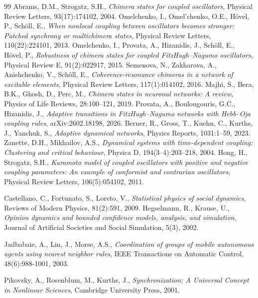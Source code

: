 ﻿\documentclass[11pt]{article}
\begin{document}
\begin{thebibliography}{99}
 Abrams, D.M., Strogatz, S.H., \emph{Chimera states for coupled oscillators}, Physical Review Letters, 93(17):174102, 2004.
 Omelchenko, I., Omel'chenko, O.E., H\"ovel, P., Sch\"oll, E., \emph{When nonlocal coupling between oscillators becomes stronger: Patched synchrony or multichimera states}, Physical Review Letters, 110(22):224101, 2013.
 Omelchenko, I., Provata, A., Hizanidis, J., Sch\"oll, E., H\"ovel, P., \emph{Robustness of chimera states for coupled FitzHugh--Nagumo oscillators}, Physical Review E, 91(2):022917, 2015.
 Semenova, N., Zakharova, A., Anishchenko, V., Sch\"oll, E., \emph{Coherence-resonance chimeras in a network of excitable elements}, Physical Review Letters, 117(1):014102, 2016.
 Majhi, S., Bera, B.K., Ghosh, D., Perc, M., \emph{Chimera states in neuronal networks: A review}, Physics of Life Reviews, 28:100--121, 2019.
 Provata, A., Boulougouris, G.C., Hizanidis, J., \emph{Adaptive transitions in FitzHugh--Nagumo networks with Hebb--Oja coupling rules}, arXiv:2602.18198, 2026.
 Berner, R., Gross, T., Kuehn, C., Kurths, J., Yanchuk, S., \emph{Adaptive dynamical networks}, Physics Reports, 1031:1--59, 2023.
 Zanette, D.H., Mikhailov, A.S., \emph{Dynamical systems with time-dependent coupling: Clustering and critical behaviour}, Physica D, 194(3--4):203--218, 2004.
 Hong, H., Strogatz, S.H., \emph{Kuramoto model of coupled oscillators with positive and negative coupling parameters: An example of conformist and contrarian oscillators}, Physical Review Letters, 106(5):054102, 2011.

 Castellano, C., Fortunato, S., Loreto, V., \emph{Statistical physics of social dynamics}, Reviews of Modern Physics, 81(2):591, 2009.
 Hegselmann, R., Krause, U., \emph{Opinion dynamics and bounded confidence models, analysis, and simulation}, Journal of Artificial Societies and Social Simulation, 5(3), 2002.

 Jadbabaie, A., Lin, J., Morse, A.S., \emph{Coordination of groups of mobile autonomous agents using nearest neighbor rules}, IEEE Transactions on Automatic Control, 48(6):988-1001, 2003.

 Pikovsky, A., Rosenblum, M., Kurths, J., \emph{Synchronization: A Universal Concept in Nonlinear Sciences}, Cambridge University Press, 2001.


\end{thebibliography}
\end{document}
